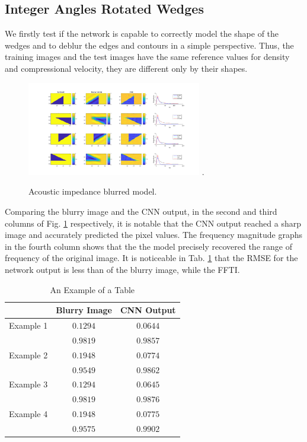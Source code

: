 \documentclass[conference,compsoc]{IEEEtran}
\begin{document}
\subsection{Integer Angles Rotated Wedges}
We firstly test if the network is capable to correctly model the shape of the wedges
and to deblur the edges and contours in a simple perspective.
Thus, the training images and the test images have the same reference values for density and compressional velocity,
they are different only by their shapes.
\begin{figure}[!t]
\centering
\includegraphics[width=3.0in]{Figs/Caso1}
\DeclareGraphicsExtensions.
\caption{Acoustic impedance blurred model.}
\label{fig_scenario1}
\end{figure}
Comparing the blurry image and the CNN output,
in the second and third columns of Fig. \ref{fig_scenario1} respectively,
it is notable that the CNN output reached a sharp image and accurately
predicted the pixel values. The frequency magnitude graphs in the fourth
column shows that the the model precisely recovered the range of frequency
of the original image. It is noticeable in Tab. \ref{table_caso_1}
that the RMSE for the network output is less than of the blurry image,
while the FFTI.
\begin{table}[!t]
\renewcommand{\arraystretch}{1.3}
\caption{An Example of a Table}
\label{table_caso_1}
\centering
\begin{tabular}{|c||c||c|}
\hline
 & Blurry Image & CNN Output \\
\hline
Example 1 & $0.1294$ & $0.0644$\\
\hline
	  & $0.9819$ & $0.9857$\\
\hline
Example 2 & $0.1948$ & $0.0774$ \\
\hline
	  & $0.9549$ & $0.9862$\\
\hline
Example 3 & $0.1294$ & $0.0645$\\
\hline
	  & $0.9819$ & $0.9876$\\
\hline
Example 4 & $0.1948$ & $0.0775$\\
\hline
	  & $0.9575$ & $0.9902$\\
\hline
\end{tabular}
\end{table}
\end{document}
